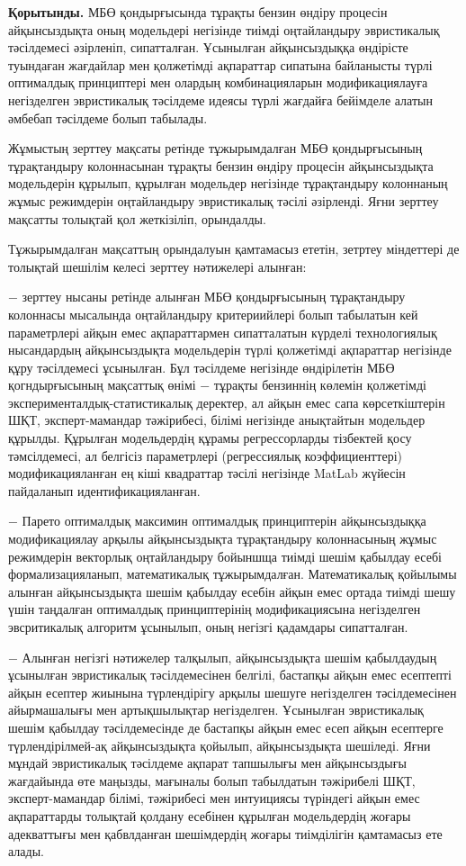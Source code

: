 {\bfseries Қорытынды.} МБӨ қондырғысында тұрақты бензин өндіру процесін
айқынсыздықта оның модельдері негізінде тиімді оңтайландыру эвристикалық
тәсілдемесі әзірленіп, сипатталған. Ұсынылған айқынсыздыққа өндірісте
туындаған жағдайлар мен қолжетімді ақпараттар сипатына байланысты түрлі
оптималдық принциптері мен олардың комбинацияларын модификациялауға
негізделген эвристикалық тәсілдеме идеясы түрлі жағдайға бейімделе
алатын әмбебап тәсілдеме болып табылады.

Жұмыстың зерттеу мақсаты ретінде тұжырымдалған МБӨ қондырғысының
тұрақтандыру колоннасынан тұрақты бензин өндіру процесін айқынсыздықта
модельдерін құрылып, құрылған модельдер негізінде тұрақтандыру
колоннаның жұмыс режимдерін оңтайландыру эвристикалық тәсілі әзірленді.
Яғни зерттеу мақсатты толықтай қол жеткізіліп, орындалды.

Тұжырымдалған мақсаттың орындалуын қамтамасыз ететін, зетртеу міндеттері
де толықтай шешілім келесі зерттеу нәтижелері алынған:

− зерттеу нысаны ретінде алынған МБӨ қондырғысының тұрақтандыру
колоннасы мысалында оңтайландыру критериийлері болып табылатын кей
параметрлері айқын емес ақпараттармен сипатталатын күрделі технологиялық
нысандардың айқынсыздықта модельдерін түрлі қолжетімді ақпараттар
негізінде құру тәсілдемесі ұсынылған. Бұл тәсілдеме негізінде
өндірілетін МБӨ қогндырғысының мақсаттық өнімі − тұрақты бензиннің
көлемін қолжетімді эксперименталдық-статистикалық деректер, ал айқын
емес сапа көрсеткіштерін ШҚТ, эксперт-мамандар тәжірибесі, білімі
негізінде анықтайтын модельдер құрылды. Құрылған модельдердің құрамы
регрессорларды тізбектей қосу тәмсілдемесі, ал белгісіз параметрлері
(регрессиялық коэффициенттері) модификацияланған ең кіші квадраттар
тәсілі негізінде MatLab жүйесін пайдаланып идентификацияланған.

− Парето оптималдық максимин оптималдық принциптерін айқынсыздыққа
модификациялау арқылы айқынсыздықта тұрақтандыру колоннасының жұмыс
режимдерін векторлық оңтайландыру бойыншща тиімді шешім қабылдау есебі
формализацияланып, математикалық тұжырымдалған. Математикалық қойылымы
алынған айқынсыздықта шешім қабылдау есебін айқын емес ортада тиімді
шешу үшін таңдалған оптималдық принциптерінің модификациясына
негізделген эвсритикалық алгоритм ұсынылып, оның негізгі қадамдары
сипатталған.

− Алынған негізгі нәтижелер талқылып, айқынсыздықта шешім қабылдаудың
ұсынылған эвристикалық тәсілдемесінен белгілі, бастапқы айқын емес
есептепті айқын есептер жиынына түрлендірігу арқылы шешуге негізделген
тәсілдемесінен айырмашалығы мен артықшылықтар негізделген. Ұсынылған
эвристикалық шешім қабылдау тәсілдемесінде де бастапқы айқын емес есеп
айқын есептерге түрлендірілмей-ақ айқынсыздықта қойылып, айқынсыздықта
шешіледі. Яғни мұндай эвристикалық тәсілдеме ақпарат тапшылығы мен
айқынсыздығы жағдайында өте маңызды, мағыналы болып табылдатын
тәжірибелі ШҚТ, эксперт-мамандар білімі, тәжірибесі мен интуициясы
түріндегі айқын емес ақпараттарды толықтай қолдану есебінен құрылған
модельдердің жоғары адекваттығы мен қабвлданған шешімдердің жоғары
тиімділігін қамтамасыз ете алады.

